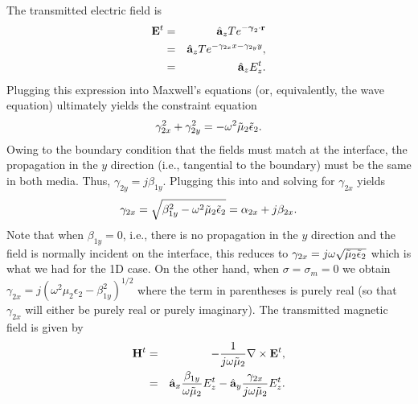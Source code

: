 The transmitted electric field is
\begin{eqnarray}
  \mathbf{E}^t &=& \hat{\mathbf{a}}_{z} T e^{-\boldsymbol{\gamma}_2\cdot\mathbf{r}} \\
          &=& \hat{\mathbf{a}}_{z} T e^{-\gamma_{2x}x - \gamma_{2y}y}, \\
	  &=& \hat{\mathbf{a}}_{z} E^t_z.
\end{eqnarray}
Plugging this expression into Maxwell's equations (or, equivalently,
the wave equation) ultimately yields the constraint equation
\begin{equation}
  \gamma_{2x}^2 + \gamma_{2y}^2 = -\omega^2\tilde{\mu}_2\tilde{\epsilon}_2.
  \label{eq:gammaConstraint}
\end{equation}
Owing to the boundary condition that the fields must match at the
interface, the propagation in the $y$ direction (i.e., tangential to
the boundary) must be the same in both media.  Thus,
$\gamma_{2y} = j\beta_{1y}$.  Plugging this into 
and solving for $\gamma_{2x}$ yields
\begin{equation}
  \gamma_{2x} = \sqrt{\beta_{1y}^2 -\omega^2\tilde{\mu}_2\tilde{\epsilon}_2} 
    = \alpha_{2x} + j\beta_{2x}.
\end{equation}
Note that when $\beta_{1y}=0$, i.e., there is no propagation in the $y$
direction and the field is normally incident on the interface, this
reduces to $\gamma_{2x} = j\omega\sqrt{\tilde{\mu}_2\tilde{\epsilon}_2}$ which is what
we had for the 1D case.  On the other hand, when $\sigma=\sigma_m=0$
we obtain $\gamma_{2x} = j\left(\omega^2\mu_2\epsilon_2 -
\beta_{1y}^2\right)^{1/2}$ where the term in parentheses is purely real
(so that $\gamma_{2x}$ will either be purely real or purely
imaginary).  The transmitted magnetic field is given by
\begin{eqnarray}
  \mathbf{H}^t &=& -\frac{1}{j\omega\tilde{\mu}_2}\nabla\times\mathbf{E}^t, \\
    &=& \hat{\mathbf{a}}_{x} \frac{\beta_{1y}}{\omega\tilde{\mu}_2} E_z^t -
        \hat{\mathbf{a}}_{y} \frac{\gamma_{2x}}{j\omega\tilde{\mu}_2} E_z^t.
\end{eqnarray}

